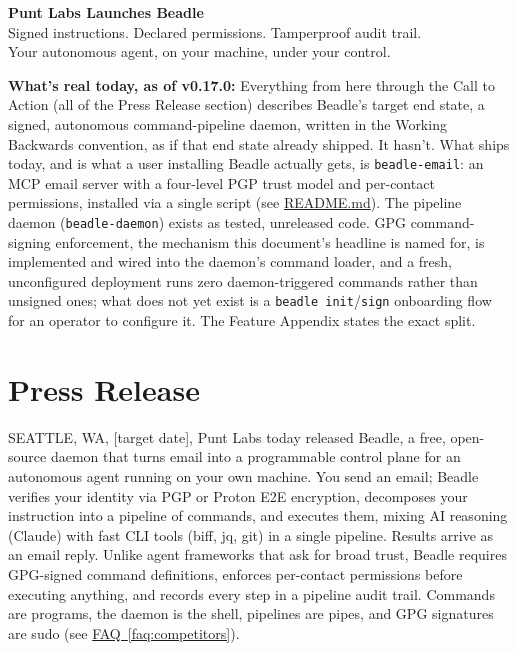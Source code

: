 \documentclass[11pt,letterpaper]{article}
\newcommand{\faqref}[1]{\hyperref[#1]{FAQ~\ref*{#1}}}
\begin{document}
\begin{center}
  {\LARGE\bfseries\color{SectionBlue}
    Punt Labs Launches Beadle} \\[0.8em]
  {\large\color{AccentGray}
    Signed instructions. Declared permissions. Tamperproof audit trail.\\
    Your autonomous agent, on your machine, under your control.}
\end{center}

\vspace{0.5em}

\noindent\textbf{\color{RiskAmber}What's real today, as of v0.17.0:}
Everything from here through the Call to Action (all of the Press Release
section) describes Beadle's target end state, a signed, autonomous
command-pipeline daemon, written in the Working Backwards
convention, as if that end state already shipped. It hasn't. What ships
today, and is what a user installing Beadle actually gets, is
\texttt{beadle-email}: an MCP email server with a four-level PGP trust
model and per-contact permissions, installed via a single script (see
\href{https://github.com/punt-labs/beadle\#readme}{README.md}). The
pipeline daemon (\texttt{beadle-daemon}) exists as tested, unreleased
code. GPG command-signing enforcement, the mechanism this document's
headline is named for, is implemented and wired into the daemon's
command loader, and a fresh, unconfigured deployment runs zero
daemon-triggered commands rather than unsigned ones; what does not yet
exist is a \texttt{beadle init}/\texttt{sign} onboarding flow for an
operator to configure it. The Feature Appendix states the exact split.

\vspace{0.5em}


\section*{Press Release}

SEATTLE, WA, [target date], Punt Labs today released Beadle,
a free, open-source daemon that turns email into a programmable control
plane for an autonomous agent running on your own machine. You send an
email; Beadle verifies your identity via PGP or Proton E2E encryption,
decomposes your instruction into a pipeline of commands, and executes
them, mixing AI reasoning (Claude) with fast CLI tools (biff, jq,
git) in a single pipeline. Results arrive as an email reply. Unlike
agent frameworks that ask for broad trust, Beadle requires GPG-signed
command definitions, enforces per-contact permissions before executing
anything, and records every step in a pipeline audit trail. Commands
are programs, the daemon is the shell, pipelines are pipes, and GPG
signatures are sudo (see \faqref{faq:competitors}).
\end{document}
